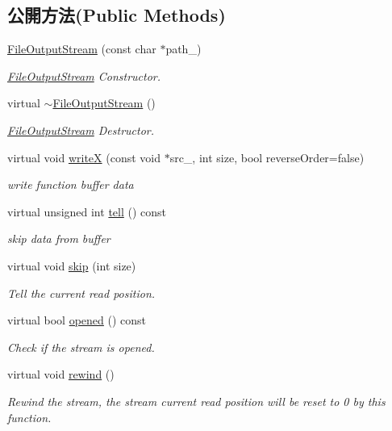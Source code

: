 \subsection*{公開方法(Public Methods)}
\begin{DoxyCompactItemize}
\item 
\hyperlink{class_magnum_1_1_file_output_stream_a1ac1e55d601670564d5b0b4c0a1f5f8a}{File\+Output\+Stream} (const char $\ast$path\+\_\+)
\begin{DoxyCompactList}\small\item\em \hyperlink{class_magnum_1_1_file_output_stream}{File\+Output\+Stream} Constructor. \end{DoxyCompactList}\item 
virtual \hyperlink{class_magnum_1_1_file_output_stream_aa0423041bf20194144689440ed94ade3}{$\sim$\+File\+Output\+Stream} ()
\begin{DoxyCompactList}\small\item\em \hyperlink{class_magnum_1_1_file_output_stream}{File\+Output\+Stream} Destructor. \end{DoxyCompactList}\item 
virtual void \hyperlink{class_magnum_1_1_file_output_stream_ab3d24c893812e35318b3a535880465fb}{writeX} (const void $\ast$src\+\_\+, int size, bool reverse\+Order=false)
\begin{DoxyCompactList}\small\item\em write function buffer data \end{DoxyCompactList}\item 
virtual unsigned int \hyperlink{class_magnum_1_1_file_output_stream_a8ea8902dfc78e6c48a171ef6d9a5ef25}{tell} () const 
\begin{DoxyCompactList}\small\item\em skip data from buffer \end{DoxyCompactList}\item 
virtual void \hyperlink{class_magnum_1_1_file_output_stream_a1d0294f4ece89e18dc9d9e7535b5a9cc}{skip} (int size)
\begin{DoxyCompactList}\small\item\em Tell the current read position. \end{DoxyCompactList}\item 
virtual bool \hyperlink{class_magnum_1_1_file_output_stream_afcb041ab2dd146a2ba38dd0fb1b53f37}{opened} () const 
\begin{DoxyCompactList}\small\item\em Check if the stream is opened. \end{DoxyCompactList}\item 
virtual void \hyperlink{class_magnum_1_1_file_output_stream_ae3b49aa7a6a37581a17284bf6015839b}{rewind} ()
\begin{DoxyCompactList}\small\item\em Rewind the stream, the stream current read position will be reset to 0 by this function. \end{DoxyCompactList}\end{DoxyCompactItemize}
